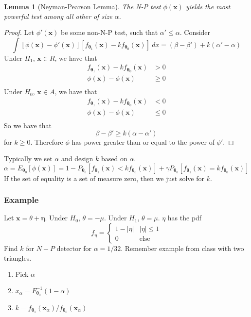 \documentclass[a4paper]{article}
\newtheorem*{lem}{Lemma}
\begin{document}
\begin{lem}[Neyman-Pearson Lemma]
  The N-P test $\phi(\bm{x})$ yields the most powerful test among all other of size $\alpha$. 
\end{lem}

\begin{proof}
  Let $\phi'(\bm{x})$ be some non-N-P test, such that $\alpha' \leq \alpha$. Consider 
  \[
    \int [\phi(\bm{x}) - \phi'(\bm{x})][f_{\bm{\theta}_1}(\bm{x}) - kf_{\bm{\theta}_0}(\bm{x})] \ dx = (\beta - \beta') + k(\alpha' - \alpha)
  \]
  Under $H_1$, $\bm{x} \in R$, we have that
  \[
    \begin{aligned}
      f_{\bm{\theta}_1} (\bm{x}) - k f_{\bm{\theta}_0} (\bm{x})  &> 0 \\
      \phi(\bm{x}) - \phi(\bm{x})  &\geq 0 \\
    \end{aligned}
  \]
  Under $H_0$, $\bm{x} \in A$, we have that
  \[
    \begin{aligned}
       f_{\bm{\theta}_1} (\bm{x}) - k f_{\bm{\theta}_0} (\bm{x})  &< 0 \\
       \phi(\bm{x}) - \phi(\bm{x})  &\leq 0 \\
    \end{aligned}
  \]
  So we have that
  \[
    \beta - \beta' \geq k(\alpha - \alpha')
  \]
  for $k \geq 0$. Therefore $\phi$ has power greater than or equal to the power of $\phi'$.
\end{proof}
Typically we set $\alpha$ and design $k$ based on $\alpha$.
\[
  \alpha = E_{\bm{\theta}_0} [\phi(\bm{x})] = 1 - P_{\bm{\theta}_0}[f_{\bm{\theta}_1}(\bm{x}) < k f_{\bm{\theta}_0}(\bm{x})] + \gamma P_{\bm{\theta}_0}[f_{\bm{\theta}_1}(\bm{x}) = k f_{\bm{\theta}_0}(\bm{x})]
\]
If the set of equality is a set of measure zero, then we just solve for $k$.

\subsubsection*{Example}%
Let $\bm{x} = \theta + \bm{\eta}$.  Under $H_0$, $\theta = -\mu$. Under $H_1$, $\theta = \mu$. $\eta$ has the pdf
\[
  f_{\eta} = 
  \begin{cases}
    1 - |\eta| & |\eta| \leq 1 \\
    0 & \text{else}
  \end{cases}
\]
Find $k$ for $N-P$ detector for $\alpha = 1/32$. Remember example from class with two triangles.

\begin{enumerate}
  \item Pick $\alpha$
  \item $x_{\alpha} = F^{-1}_{\bm{\theta}_0}(1 - \alpha)$
  \item $k = f_{\bm{\theta}_1}(\bm{x}_{\alpha})/f_{\bm{\theta}_0}(\bm{x}_{\alpha})$
\end{enumerate}
\end{document}

